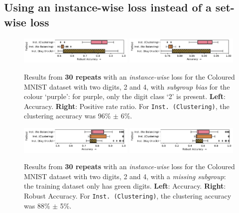 \subsection{Using an instance-wise loss instead of a set-wise loss}\label{ssec:no-mil}
\begin{figure}[htp]
  \centering
  \includegraphics[width=0.49\textwidth]{supmatch/figures/cmnist/subgroup_bias_nomil/cmnist_2v4_subgroup_bias_acc-min.pdf}
  \includegraphics[width=0.49\textwidth]{supmatch/figures/cmnist/subgroup_bias_nomil/cmnist_2v4_subgroup_bias_acc.pdf}
  \caption{
    Results from \textbf{30 repeats} with an \emph{instance-wise} loss for the Coloured MNIST
    dataset with two digits, 2 and 4, with \emph{subgroup bias} for the colour
    `{\color{purple}purple}': for {\color{purple}purple}, only the digit class `2' is present.
    \textbf{Left}: Accuracy.
    \textbf{Right}: Positive rate ratio.
    For \texttt{Inst.\ (Clustering)}, the clustering accuracy was 96\% $\pm$ 6\%.
  }%
  \label{fig:cmnist-2v4-partial-add-nomil}
\end{figure}
\begin{figure}[htp]
  \centering
  \includegraphics[width=0.49\textwidth]{supmatch/figures/cmnist/missing_subgroup_nomil/cmnist_2v4_miss_subgroup_acc.pdf}
  \includegraphics[width=0.49\textwidth]{supmatch/figures/cmnist/missing_subgroup_nomil/cmnist_2v4_miss_subgroup_acc-min.pdf}

  \caption{
    Results from \textbf{30 repeats} with an \emph{instance-wise} loss for the Coloured MNIST
    dataset with two digits, 2 and 4, with a \emph{missing subgroup}: the training dataset only has
    {\color{green}green} digits.
    \textbf{Left}: Accuracy.
    \textbf{Right}: Robust Accuracy.
    For \texttt{Inst.\ (Clustering)}, the clustering accuracy was 88\% $\pm$ 5\%.
  }%
  \label{fig:cmnist-2v4-miss-s-add-nomil}
\end{figure}
